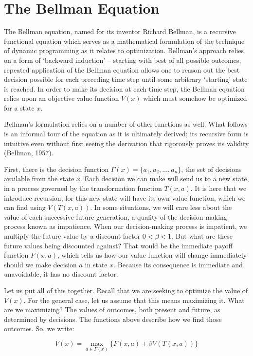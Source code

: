 \documentclass[paper=a4, fontsize=11pt,twoside]{report}   %
\begin{document}
\section{The Bellman Equation}
The Bellman equation, named for its inventor Richard Bellman, is a recursive functional equation which serves as a mathematical formulation of the technique of dynamic programming as it relates to optimization. Bellman’s approach relies on a form of ‘backward induction’ – starting with best of all possible outcomes, repeated application of the Bellman equation allows one to reason out the best decision possible for each preceding time step until some arbitrary ‘starting’ state is reached. In order to make its decision at each time step, the Bellman equation relies upon an objective value function $V(x)$ which must somehow be optimized for a state $x$. 

Bellman’s formulation relies on a number of other functions as well. What follows is an informal tour of the equation as it is ultimately derived; its recursive form is intuitive even without first seeing the derivation that rigorously proves its validity (Bellman, 1957).  

First, there is the decision function $\Gamma(x) = \{a_1,a_2,\ldots,a_n\}$, the set of decisions available from the state $x$. Each decision we can make will send us to a new state, in a process governed by the transformation function $T(x,a)$. It is here that we introduce recursion, for this new state will have its own value function, which we can find using $V(T(x,a))$. In some situations, we will care less about the value of each successive future generation, a quality of the decision making process known as impatience. When our decision-making process is impatient, we multiply the future value by a discount factor $0 < \beta< 1$. But what are these future values being discounted against? That would be the immediate payoff function $F(x,a)$, which tells us how our value function will change immediately should we make decision $a$ in state $x$. Because its consequence is immediate and unavoidable, it has no discount factor.

Let us put all of this together. Recall that we are seeking to optimize the value of $V(x)$. For the general case, let us assume that this means maximizing it. What are we maximizing? The values of outcomes, both present and future, as determined by decisions. The functions above describe how we find those outcomes. So, we write: 

$$V(x) = \max_{a \in \Gamma(x)}\{F(x,a)+\beta V(T(x,a))\}$$
\end{document}
